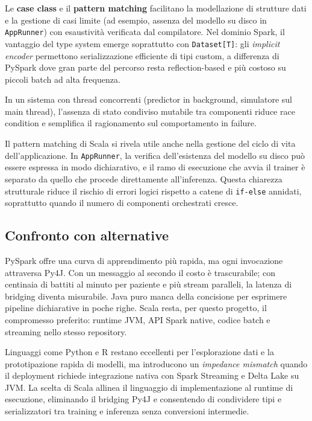 Le \textbf{case class} e il \textbf{pattern matching} facilitano la modellazione di strutture dati e la gestione di casi limite (ad esempio, assenza del modello su disco in \texttt{AppRunner}) con esaustività verificata dal compilatore.
Nel dominio Spark, il vantaggio del type system emerge soprattutto con \texttt{Dataset[T]}: gli \emph{implicit encoder} permettono serializzazione efficiente di tipi custom, a differenza di PySpark dove gran parte del percorso resta reflection-based e più costoso su piccoli batch ad alta frequenza.

In un sistema con thread concorrenti (predictor in background, simulatore sul main thread), l'assenza di stato condiviso mutabile tra componenti riduce race condition e semplifica il ragionamento sul comportamento in failure.

Il pattern matching di Scala si rivela utile anche nella gestione del ciclo di vita dell'applicazione.
In \texttt{AppRunner}, la verifica dell'esistenza del modello su disco può essere espressa in modo dichiarativo, e il ramo di esecuzione che avvia il trainer è separato da quello che procede direttamente all'inferenza.
Questa chiarezza strutturale riduce il rischio di errori logici rispetto a catene di \texttt{if-else} annidati, soprattutto quando il numero di componenti orchestrati cresce.

\subsection{Confronto con alternative}

PySpark offre una curva di apprendimento più rapida, ma ogni invocazione attraversa Py4J.
Con un messaggio al secondo il costo è trascurabile; con centinaia di battiti al minuto per paziente e più stream paralleli, la latenza di bridging diventa misurabile.
Java puro manca della concisione per esprimere pipeline dichiarative in poche righe.
Scala resta, per questo progetto, il compromesso preferito: runtime JVM, API Spark native, codice batch e streaming nello stesso repository.

Linguaggi come Python e R restano eccellenti per l'esplorazione dati e la prototipazione rapida di modelli, ma introducono un \emph{impedance mismatch} quando il deployment richiede integrazione nativa con Spark Streaming e Delta Lake su JVM.
La scelta di Scala allinea il linguaggio di implementazione al runtime di esecuzione, eliminando il bridging Py4J e consentendo di condividere tipi e serializzatori tra training e inferenza senza conversioni intermedie.

